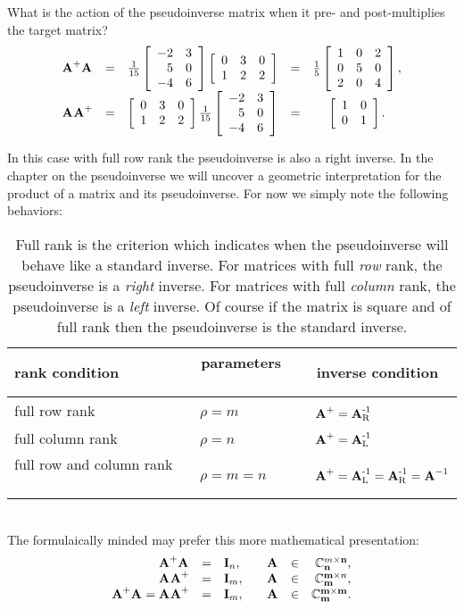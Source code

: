 What is the action of the pseudoinverse matrix when it pre- and post-multiplies the target matrix?
\begin{equation}
  \begin{array}{rcccc}
    \leftinv&=&
    \frac{1}{15}
  \mat{rr}
  {
 -2 & 3 \\
  5 & 0 \\
 -4 & 6
  }
  \mat{ccc}
  {
  0 & 3 & 0 \\
  1 & 2 & 2
  } &=&
  \frac{1}{5}
  \mat{ccc}
  {
 1 & 0 & 2 \\
 0 & 5 & 0 \\
 2 & 0 & 4
  },\\
    \rightinv&=&
  \mat{ccc}
  {
  0 & 3 & 0 \\
  1 & 2 & 2
  } 
    \frac{1}{15}
    \mat{rr}
  {
 -2 & 3 \\
  5 & 0 \\
 -4 & 6
  }
&=& \itwo.
  \end{array}
  \label{eq:gen:lr}
\end{equation}

In this case with full row rank the pseudoinverse is also a right inverse. In the chapter on the pseudoinverse we will uncover a geometric interpretation for the product of a matrix and its pseudoinverse. For now we simply note the following behaviors:
\begin{table}[htdp]
\begin{center}
\begin{tabular}{lll}
rank condition   & \ parameters \ & \ inverse condition\\\hline
full row rank    & \ $\rho = m $  & \ $\textbf{A}^{\mathrm{+}} = \operatorname{\textbf{A}^{\mathrm{-1}}_{\mathrm{R}}}$ $\phantom{A^{-1^{-1^{-1}}}}$ \\[3pt]
full column rank & \ $\rho = n $  & \ $\textbf{A}^{\mathrm{+}} = \operatorname{\textbf{A}^{\mathrm{-1}}_{\mathrm{L}}}$ \\[3pt]
full row and column rank \ & \ $\rho = m = n $ \ & \ $\textbf{A}^{\mathrm{+}} = \operatorname{\textbf{A}^{\mathrm{-1}}_{\mathrm{L}}} = \operatorname{\textbf{A}^{\mathrm{-1}}_{\mathrm{R}}} = \textbf{A}^{\mathrm{-1}}$ \\[13pt]
\end{tabular}
\end{center}
\label{tab:pmii:rank}
\caption{Full rank is the criterion which indicates when the pseudoinverse will behave like a standard inverse. For matrices with full \textit{row} rank, the pseudoinverse is a \textit{right} inverse. For matrices with full \textit{column} rank, the pseudoinverse is a \textit{left} inverse. Of course if the matrix is square and of full rank then the pseudoinverse is the standard inverse.}
\end{table}%
\\
The formulaically minded may prefer this more mathematical presentation:
\begin{equation}
  \begin{array}{rclrcr}
    \operatorname{\textbf{A}^{\mathrm{+}}\textbf{A}^{\mathrm{}}} &=& \textbf{I}_{n}, & \quad \textbf{A}^{\mathrm{}}&\in&\mathbb{C}^{m \times \textbf{n}}_{\textbf{n}},\\
    \operatorname{\textbf{A}^{\mathrm{}}\textbf{A}^{\mathrm{+}}} &=& \textbf{I}_{m}, & \quad \textbf{A}^{\mathrm{}}&\in&\mathbb{C}^{\textbf{m} \times n}_{\textbf{m}},\\
    \operatorname{\textbf{A}^{\mathrm{+}}\textbf{A}^{\mathrm{}}} = \operatorname{\textbf{A}^{\mathrm{}}\textbf{A}^{\mathrm{+}}} &=& \textbf{I}_{m}, & \quad \textbf{A}^{\mathrm{}}&\in&\mathbb{C}^{\textbf{m} \times \textbf{m}}_{\textbf{m}}.\\
  \end{array}
\end{equation}

